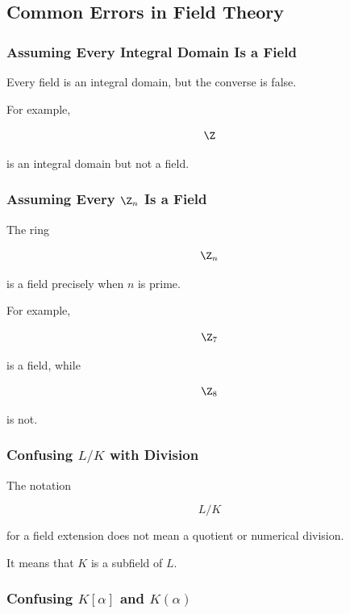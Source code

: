 \subsection{Common Errors in Field Theory}
\label{subsec:common-field-errors}

\subsubsection{Assuming Every Integral Domain Is a Field}

Every field is an integral domain, but the converse is false.

For example,

\[ \Z \]

is an integral domain but not a field.

\subsubsection{Assuming Every \(\Z_n\) Is a Field}

The ring

\[ \Z_n \]

is a field precisely when \(n\) is prime.

For example,

\[ \Z_7 \]

is a field, while

\[ \Z_8 \]

is not.

\subsubsection{Confusing \(L/K\) with Division}

The notation

\[ L/K \]

for a field extension does not mean a quotient or numerical division.

It means that \(K\) is a subfield of \(L\).

\subsubsection{Confusing \(K[\alpha]\) and \(K(\alpha)\)}

